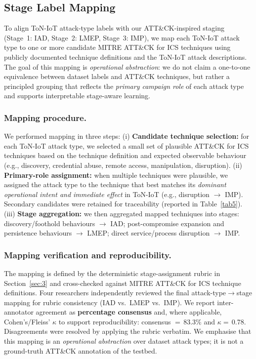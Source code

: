 \documentclass[pdflatex,sn-mathphys-num]{sn-jnl}
\theoremstyle{thmstyleone}%
\theoremstyle{thmstyletwo}%
\theoremstyle{thmstylethree}%
\begin{document}
\subsection{Stage Label Mapping}
\label{subsec:stage_mapping}

To align ToN-IoT attack-type labels with our ATT\&CK-inspired staging (Stage~1: IAD, Stage~2: LMEP, Stage~3: IMP), we map each ToN-IoT attack type to one or more candidate MITRE ATT\&CK for ICS techniques using publicly documented technique definitions and the ToN-IoT attack descriptions. The goal of this mapping is \emph{operational abstraction}: we do not claim a one-to-one equivalence between dataset labels and ATT\&CK techniques, but rather a principled grouping that reflects the \emph{primary campaign role} of each attack type and supports interpretable stage-aware learning.

\subsubsection{Mapping procedure.}
We performed mapping in three steps:
(i) \textbf{Candidate technique selection:} for each ToN-IoT attack type, we selected a small set of plausible ATT\&CK for ICS techniques based on the technique definition and expected observable behaviour (e.g., discovery, credential abuse, remote access, manipulation, disruption).
(ii) \textbf{Primary-role assignment:} when multiple techniques were plausible, we assigned the attack type to the technique that best matches its \emph{dominant operational intent and immediate effect} in ToN-IoT (e.g., disruption $\rightarrow$ IMP). Secondary candidates were retained for traceability (reported in Table~\ref{tab5}).
(iii) \textbf{Stage aggregation:} we then aggregated mapped techniques into stages: discovery/foothold behaviours $\rightarrow$ IAD; post-compromise expansion and persistence behaviours $\rightarrow$ LMEP; direct service/process disruption $\rightarrow$ IMP.


\subsubsection{Mapping verification and reproducibility.}
The mapping is defined by the deterministic stage-assignment rubric in Section~\ref{sec:3} and cross-checked against MITRE ATT\&CK for ICS technique definitions. Four researchers independently reviewed the final attack-type$\rightarrow$stage mapping for rubric consistency (IAD vs.\ LMEP vs.\ IMP). We report inter-annotator agreement as \textbf{percentage consensus} and, where applicable, Cohen's/Fleiss' $\kappa$ to support reproducibility: consensus $=\,$83.3\% and $\kappa=\,$0.78. Disagreements were resolved by applying the rubric verbatim. We emphasise that this mapping is an \emph{operational abstraction} over dataset attack types; it is not a ground-truth ATT\&CK annotation of the testbed.
\end{document}
